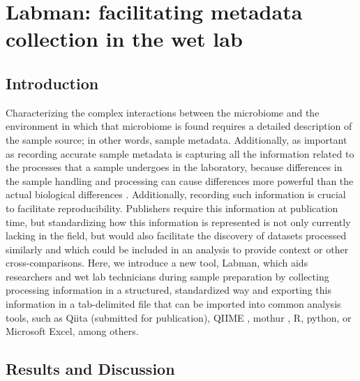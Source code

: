 \glsresetall

\section{Labman: facilitating metadata collection in the wet lab}\label{section_platemapper}

\subsection{Introduction}

Characterizing the complex interactions between the microbiome and the environment
in which that microbiome is found requires a detailed description of the sample
source; in other words, sample metadata. Additionally, as important as recording
accurate sample metadata is capturing all the information related to the processes
that a sample undergoes in the laboratory, because differences in the sample
handling and processing can cause differences more powerful than the actual
biological differences \cite{Sinha2017, Song2016, Kuczynski2011, Tremblay2015}. Additionally, recording such information is
crucial to facilitate reproducibility. Publishers require this information at
publication time, but standardizing how this information is represented is not
only currently lacking in the field, but would also facilitate the discovery of
datasets processed similarly and which could be included in an analysis to
provide context or other cross-comparisons. Here, we introduce a new tool,
Labman, which aids researchers and wet lab technicians during sample preparation
by collecting processing information in a structured, standardized way and
exporting this information in a tab-delimited file that can be imported into
common analysis tools, such as Qiita (submitted for publication), QIIME \cite{Caporaso2010},
mothur \cite{Schloss2009}, R, python, or Microsoft Excel, among others.

\subsection{Results and Discussion}

